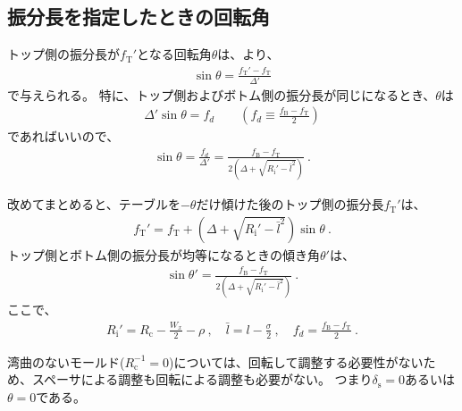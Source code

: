 \subsection{振分長を指定したときの回転角}
トップ側の振分長が$f_\mathrm T'$となる回転角$\theta$は、より、
\begin{align*}
  \sin\theta = \frac{f_\mathrm T'-f_\mathrm T}{\Delta'}
\end{align*}
で与えられる。
特に、トップ側およびボトム側の振分長が同じになるとき、$\theta$は
\begin{align*}
  \Delta'\sin\theta = f_d \qquad \left(f_d \equiv \frac{f_\mathrm B-f_\mathrm T}2\right)
\end{align*}
であればいいので、
\begin{align*}
  \sin\theta = \frac{f_d}{\Delta'}
  = \frac{f_\mathrm B-f_\mathrm T}{2\left(\Delta+\sqrt{R_\mathrm i'-\bar l^2}\right)}~.
\end{align*}
\begin{hosoku}
改めてまとめると、テーブルを$-\theta$だけ傾けた後のトップ側の振分長$f_\mathrm T'$は、
\begin{align*}
  f_\mathrm T' = f_\mathrm T+\left(\Delta+\sqrt{R_\mathrm i'-\bar l^2}\right)\sin\theta\ .
\end{align*}
トップ側とボトム側の振分長が均等になるときの傾き角$\theta'$は、
\begin{align*}
  \sin\theta' = \frac{f_\mathrm B-f_\mathrm T}{2\left(\Delta+\sqrt{R_\mathrm i'-\bar l^2}\right)}\ .
\end{align*}
ここで、
\begin{align*}
  R_\mathrm i' = R_\mathrm c-\frac{W_x}2-\rho\ ,\quad
  \bar l = l-\frac\sigma2\ ,\quad
  f_d = \frac{f_\mathrm B-f_\mathrm T}2\ .
\end{align*}
\end{hosoku}



湾曲のないモールド($R_\mathrm c^{-1}= 0$)については、回転して調整する必要性がないため、スペーサによる調整も回転による調整も必要がない。
つまり$\delta_\mathrm s = 0$あるいは$\theta = 0$である。

